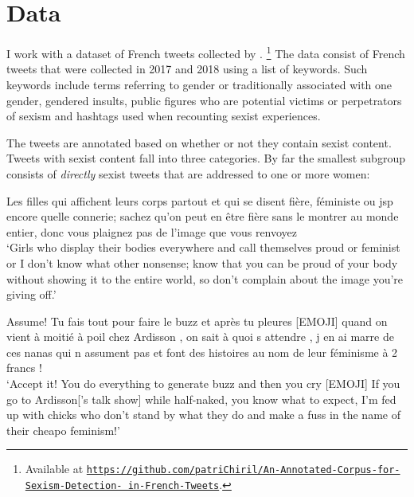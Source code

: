 \section{Data}
\label{sec:tweets-data}

I work with a dataset of French tweets collected by \citet{chiril2020annotated}.%
\footnote{Available at \href{https://github.com/patriChiril/An-Annotated-Corpus-for-Sexism-Detection-in-French-Tweets}{\texttt{https://github.com/patriChiril/An-Annotated-Corpus-for-Sexism-Detection- in-French-Tweets}}.}
The data consist of French tweets that were collected in 2017 and 2018 using a list of keywords.
Such keywords include terms referring to gender or traditionally associated with one gender, gendered insults, public figures who are potential victims or perpetrators of sexism and hashtags used when recounting sexist experiences.

The tweets are annotated based on whether or not they contain sexist content.
Tweets with sexist content fall into three categories.
By far the smallest subgroup consists of \textit{directly} sexist tweets that are addressed to one or more women:

\begin{exe}
\ex Les filles qui affichent leurs corps partout et qui se disent fière, féministe ou jsp encore quelle connerie; sachez qu'on peut en être fière sans le montrer au monde entier, donc vous plaignez pas de l'image que vous renvoyez\\
`Girls who display their bodies everywhere and call themselves proud or feminist or I don't know what other nonsense; know that you can be proud of your body without showing it to the entire world, so don't complain about the image you're giving off.'


\ex Assume!  Tu fais tout pour faire le buzz et après tu pleures [EMOJI] quand on vient à moitié à poil chez Ardisson , on sait à quoi s attendre , j en ai marre de ces nanas qui n assument pas et font des histoires au nom de leur féminisme à 2 francs !\\
`Accept it! You do everything to generate buzz and then you cry [EMOJI] If you go to Ardisson['s talk show] while half-naked, you know what to expect, I'm fed up with chicks who don't stand by what they do and make a fuss in the name of their cheapo feminism!'
\end{exe}

